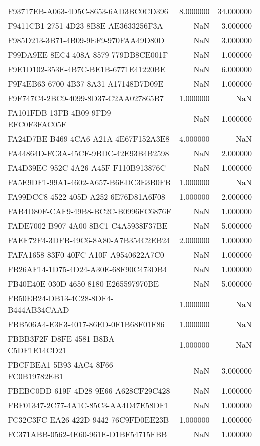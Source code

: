 \begin{tabular}{lrr}
F93717EB-A063-4D5C-8653-6AD3BC0CD396 & 8.000000 & 34.000000 \\
F9411CB1-2751-4D23-8B8E-AE3633256F3A & NaN & 3.000000 \\
F985D213-3B71-4B09-9EF9-970FAA49D80D & NaN & 3.000000 \\
F99DA9EE-8EC4-408A-8579-779DB8CE001F & NaN & 1.000000 \\
F9E1D102-353E-4B7C-BE1B-6771E41220BE & NaN & 6.000000 \\
F9F4EB63-6700-4B37-8A31-A17148D7D09E & NaN & 1.000000 \\
F9F747C4-2BC9-4099-8D37-C2AA027865B7 & 1.000000 & NaN \\
FA101FDB-13FB-4B09-9FD9-EFC0F3FAC05F & NaN & 1.000000 \\
FA24D7BE-B469-4CA6-A21A-4E67F152A3E8 & 4.000000 & NaN \\
FA44864D-FC3A-45CF-9BDC-42E93B4B2598 & NaN & 2.000000 \\
FA4D39EC-952C-4A26-A45F-F110B913876C & NaN & 1.000000 \\
FA5E9DF1-99A1-4602-A657-B6EDC3E3B0FB & 1.000000 & NaN \\
FA99DCC8-4522-405D-A252-6E76D81A6F08 & 1.000000 & 2.000000 \\
FAB4D80F-CAF9-49B8-BC2C-B0996FC6876F & NaN & 1.000000 \\
FADE7002-B907-4A00-8BC1-C4A5938F37BE & NaN & 5.000000 \\
FAEF72F4-3DFB-49C6-8A80-A7B354C2EB24 & 2.000000 & 1.000000 \\
FAFA1658-83F0-40FC-A10F-A9540622A7C0 & NaN & 1.000000 \\
FB26AF14-1D75-4D24-A30E-68F90C473DB4 & NaN & 1.000000 \\
FB40E40E-030D-4650-8180-E265597970BE & NaN & 5.000000 \\
FB50EB24-DB13-4C28-8DF4-B444AB34CAAD & 1.000000 & NaN \\
FBB506A4-E3F3-4017-86ED-0F1B68F01F86 & 1.000000 & NaN \\
FBBB3F2F-D8FE-4581-B8BA-C5DF1E14CD21 & 1.000000 & NaN \\
FBCFBEA1-5B93-4AC4-8F66-FC0B19782EB1 & NaN & 3.000000 \\
FBEBC0DD-619F-4D28-9E66-A628CF29C428 & NaN & 1.000000 \\
FBF01347-2C77-4A1C-85C3-AA4D47E58DF1 & NaN & 1.000000 \\
FC32C3FC-EA26-422D-9442-76C9FD0EE23B & 1.000000 & 1.000000 \\
FC371ABB-0562-4E60-961E-D1BF54715FBB & NaN & 1.000000 \\

\end{tabular}
